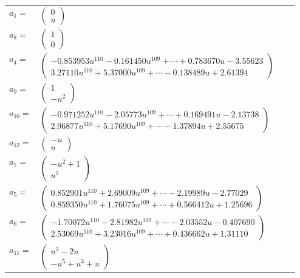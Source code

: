 \documentclass[1p]{elsarticle_modified}
\theoremstyle{definition}
\begin{document}
\begin{tabular}{m{7pt} m{180pt} m{7pt} m{180pt} }
\flushright $a_{1}=$&$\begin{pmatrix}0\\u\end{pmatrix}$ \\
\flushright $a_{8}=$&$\begin{pmatrix}1\\0\end{pmatrix}$ \\
\flushright $a_{4}=$&$\begin{pmatrix}-0.853953 u^{110}-0.161450 u^{109}+\cdots+0.783670 u-3.55623\\3.27110 u^{110}+5.37000 u^{109}+\cdots-0.138489 u+2.61394\end{pmatrix}$ \\
\flushright $a_{9}=$&$\begin{pmatrix}1\\- u^2\end{pmatrix}$ \\
\flushright $a_{10}=$&$\begin{pmatrix}-0.971252 u^{110}-2.05773 u^{109}+\cdots+0.169491 u-2.13738\\2.96877 u^{110}+5.17690 u^{109}+\cdots-1.37894 u+2.55675\end{pmatrix}$ \\
\flushright $a_{12}=$&$\begin{pmatrix}- u\\u\end{pmatrix}$ \\
\flushright $a_{7}=$&$\begin{pmatrix}- u^2+1\\u^2\end{pmatrix}$ \\
\flushright $a_{5}=$&$\begin{pmatrix}0.852901 u^{110}+2.69009 u^{109}+\cdots-2.19989 u-2.77029\\0.859350 u^{110}+1.76075 u^{109}+\cdots+0.566412 u+1.25696\end{pmatrix}$ \\
\flushright $a_{6}=$&$\begin{pmatrix}-1.70072 u^{110}-2.81982 u^{109}+\cdots-2.03552 u-0.407690\\2.53069 u^{110}+3.23016 u^{109}+\cdots+0.436662 u+1.31110\end{pmatrix}$ \\
\flushright $a_{11}=$&$\begin{pmatrix}u^3-2 u\\- u^5+u^3+u\end{pmatrix}$ \\

\end{tabular}
\end{document}
